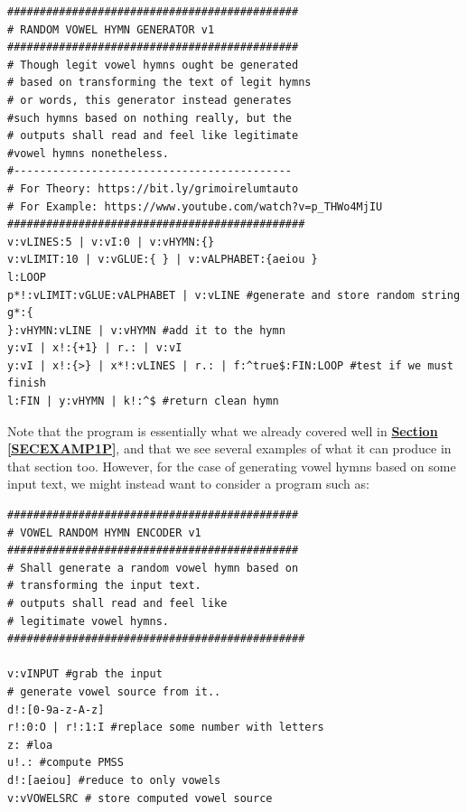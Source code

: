 \documentclass[a4paper, 18pt]{book} %
\begin{document}
{{{  \begin{tcolorbox}[teaterminalstyle, title=TEA Application: RANDOM VOWEL HYMN GENERATOR v1, breakable]
  \begin{lstlisting}[language=TEA,breaklines=true,]
#############################################
# RANDOM VOWEL HYMN GENERATOR v1
#############################################
# Though legit vowel hymns ought be generated
# based on transforming the text of legit hymns
# or words, this generator instead generates 
#such hymns based on nothing really, but the
# outputs shall read and feel like legitimate
#vowel hymns nonetheless.
#-------------------------------------------
# For Theory: https://bit.ly/grimoirelumtauto
# For Example: https://www.youtube.com/watch?v=p_THWo4MjIU
##############################################
v:vLINES:5 | v:vI:0 | v:vHYMN:{}
v:vLIMIT:10 | v:vGLUE:{ } | v:vALPHABET:{aeiou }
l:LOOP
p*!:vLIMIT:vGLUE:vALPHABET | v:vLINE #generate and store random string
g*:{
}:vHYMN:vLINE | v:vHYMN #add it to the hymn
y:vI | x!:{+1} | r.: | v:vI 
y:vI | x!:{>} | x*!:vLINES | r.: | f:^true$:FIN:LOOP #test if we must finish
l:FIN | y:vHYMN | k!:^$ #return clean hymn
   \end{lstlisting}
  \end{tcolorbox}
  \label{FIGTEAVOWELHYMNGEN}

\vspace{1em}


Note that the program is essentially what we already covered well in \textbf{\hyperref[SECEXAMP1P]{Section \ref{SECEXAMP1P}}}, and that we see several examples of what it can produce in that section too. However, for the case of generating vowel hymns based on some input text, we might instead want to consider a program such as:

\vspace{2em}


  \begin{tcolorbox}[teaterminalstyle, title=TEA Application: A VOWEL RANDOM HYMN ENCODER v1, breakable]
  \begin{lstlisting}[language=TEA,breaklines=true,]
#############################################
# VOWEL RANDOM HYMN ENCODER v1
#############################################
# Shall generate a random vowel hymn based on 
# transforming the input text.
# outputs shall read and feel like 
# legitimate vowel hymns.
##############################################

v:vINPUT #grab the input
# generate vowel source from it..
d!:[0-9a-z-A-z]
r!:0:O | r!:1:I #replace some number with letters
z: #loa
u!.: #compute PMSS
d!:[aeiou] #reduce to only vowels
v:vVOWELSRC # store computed vowel source


\end{lstlisting}
\end{tcolorbox}}}}
\end{document}
